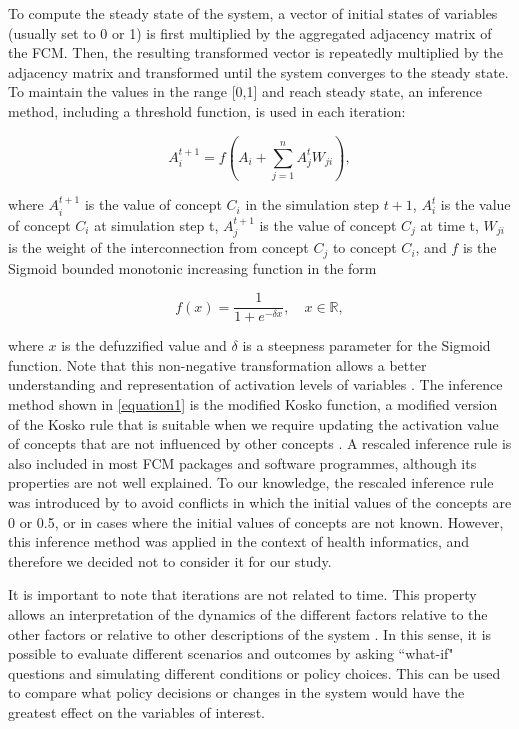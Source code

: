To compute the steady state of the system, a vector of initial states of variables (usually set to 0 or 1) is first multiplied by the aggregated adjacency matrix of the FCM. Then, the resulting transformed vector is repeatedly multiplied by the adjacency matrix and  transformed until the system converges to the steady state. To maintain the values in the range [0,1] and reach steady state, an inference method, including a threshold function, is used in each iteration:

\begin{equation}
\label{equation1} 
A_i^{t+1} = f \left( A_i + \sum_{j=1}^{n} A_j^t W_{ji} \right), 
\end{equation}

where $A_i^{t+1}$ is the value of concept $C_i$ in the simulation step $t+1$, $A_i^{t}$ is the value of concept $C_i$ at simulation step t, $A_j^{t+1}$ is the value of concept $C_j$ at time t, $W_{ji}$ is the weight of the interconnection from concept $C_j$ to concept $C_i$, and $f$ is the Sigmoid bounded monotonic increasing function in the form

\begin{equation}
\label{equation2}  
f(x) = \frac{1}{1+e^{-\delta x}}, \quad  x \in \mathbb{R}, 
\end{equation}

where $x$ is the defuzzified value and $\delta$ is a steepness parameter for the Sigmoid function. Note that this non-negative transformation allows a better understanding and representation of activation levels of variables \citep{ozesmi2004ecological}. The inference method shown in \cref{equation1} is the modified Kosko function, a modified version of the Kosko rule that is suitable when we require updating the activation value of concepts that are not influenced by other concepts \citep{sujamol2018study}. A rescaled inference rule is also included in most FCM packages and software programmes, although its properties are not well explained. To our knowledge, the rescaled inference rule was introduced by \cite{papageorgiou2011new} to avoid conflicts in which the initial values of the concepts are 0 or 0.5, or in cases where the initial values of concepts are not known. However, this inference method was applied in the context of health informatics, and therefore we decided not to consider it for our study. 



It is important to note that iterations are not related to time. This property allows an interpretation of the dynamics of the different factors relative to the other factors or relative to other descriptions of the system \citep{edwards2021building, diniz2015mapping}. In this sense, it is possible to evaluate different scenarios and outcomes by asking ``what-if" questions and simulating different conditions or policy choices. This can be used to compare what policy decisions or changes in the system would have the greatest effect on the variables of interest.

